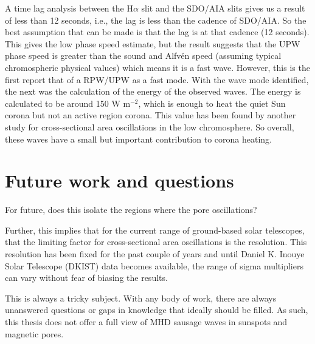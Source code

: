     A time lag analysis between the H$\alpha$ slit and the SDO/AIA slits gives us a result of less than 12 seconds, i.e., the lag is less than the cadence of SDO/AIA.
    So the best assumption that can be made is that the lag is at that cadence (12 seconds). 
    This gives the low phase speed estimate, but the result suggests that the UPW phase speed is greater than the sound and Alfv\'en speed (assuming typical chromospheric physical values) which means it is a fast wave. 
    However, this is the first report that of a RPW/UPW as a fast mode.
    With the wave mode identified, the next was the calculation of the energy of the observed waves.
    The energy is calculated to be around 150 W m$^{-2}$, which is enough to heat the quiet Sun corona but not an active region corona.
    This value has been found by another study for cross-sectional area oscillations in the low chromosphere.
    So overall, these waves have a small but important contribution to corona heating.
    
\section{Future work and questions}
    
    
        For future, does this isolate the regions where the pore oscillations? 
        
      
      Further, this implies that for the current range of ground-based solar telescopes, that the limiting factor for cross-sectional area oscillations is the resolution.
      This resolution has been fixed for the past couple of years and until Daniel K. Inouye Solar Telescope (DKIST) data becomes available, the range of sigma multipliers can vary without fear of biasing the results. 
             
    This is always a tricky subject.
    With any body of work, there are always unanswered questions or gaps in knowledge that ideally should be filled.
    As such, this thesis does not offer a full view of MHD sausage waves in sunspots and magnetic pores.
    
